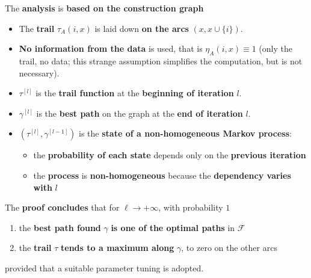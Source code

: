 The \textbf{analysis} is \textbf{based on the construction graph}
\begin{itemize}
	\item The \textbf{trail} $\tau_A (i, x)$ is laid down \textbf{on the arcs} $(x, x \cup \{i\})$.\\
	
	\item \textbf{No information from the data} is used, that is $\eta_A (i, x) \equiv 1$ (only the trail, no data; this strange assumption simplifies the computation, but is not necessary).\\
	
	\item $\tau^{[l]}$ is the \textbf{trail function} at the \textbf{beginning of iteration} $l$.\\
	
	\item $\gamma^{[l]}$ is the \textbf{best path} on the graph at the \textbf{end of iteration} $l$.\\
	
	\item $(\tau^{[l]}, \gamma^{[l−1]})$ is the \textbf{state of a non-homogeneous Markov process}:
	\begin{itemize}
		\item the \textbf{probability of each state} depends only on the \textbf{previous iteration}
		
		\item the \textbf{process} is \textbf{non-homogeneous} because the \textbf{dependency varies with} $l$
	\end{itemize}
\end{itemize}

The \textbf{proof concludes} that for $\ell \rightarrow + \infty$, with probability $1$
\begin{enumerate}
	\item the \textbf{best path found} $\gamma$ \textbf{is one of the optimal paths} in $\mathcal{F}$
	
	\item the \textbf{trail} $\tau$ \textbf{tends to a maximum along} $\gamma$, to zero on the other arcs
\end{enumerate}
provided that a suitable parameter tuning is adopted.\\

\newpage

